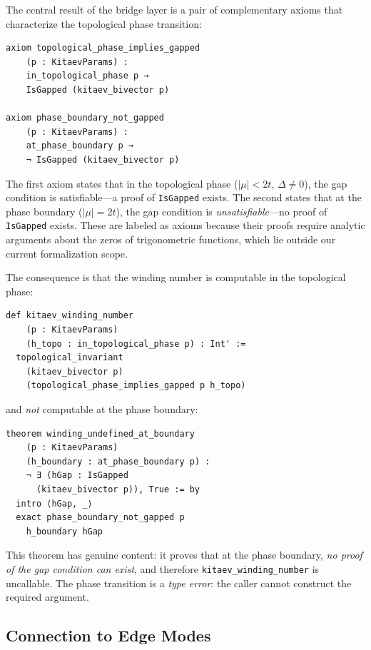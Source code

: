 \documentclass[11pt,a4paper]{article}
\newcommand{\lean}[1]{\lstinline[language=Lean4]{#1}}
\begin{document}
The central result of the bridge layer is a pair of complementary axioms that characterize the topological phase transition:

\begin{lstlisting}
axiom topological_phase_implies_gapped
    (p : KitaevParams) :
    in_topological_phase p →
    IsGapped (kitaev_bivector p)

axiom phase_boundary_not_gapped
    (p : KitaevParams) :
    at_phase_boundary p →
    ¬ IsGapped (kitaev_bivector p)
\end{lstlisting}

The first axiom states that in the topological phase ($|\mu| < 2t$, $\Delta \neq 0$), the gap condition is satisfiable---a proof of \lean{IsGapped} exists. The second states that at the phase boundary ($|\mu| = 2t$), the gap condition is \emph{unsatisfiable}---no proof of \lean{IsGapped} exists. These are labeled as axioms because their proofs require analytic arguments about the zeros of trigonometric functions, which lie outside our current formalization scope.

The consequence is that the winding number is computable in the topological phase:

\begin{lstlisting}
def kitaev_winding_number
    (p : KitaevParams)
    (h_topo : in_topological_phase p) : Int' :=
  topological_invariant
    (kitaev_bivector p)
    (topological_phase_implies_gapped p h_topo)
\end{lstlisting}

and \emph{not} computable at the phase boundary:

\begin{lstlisting}
theorem winding_undefined_at_boundary
    (p : KitaevParams)
    (h_boundary : at_phase_boundary p) :
    ¬ ∃ (hGap : IsGapped
      (kitaev_bivector p)), True := by
  intro ⟨hGap, _⟩
  exact phase_boundary_not_gapped p
    h_boundary hGap
\end{lstlisting}

This theorem has genuine content: it proves that at the phase boundary, \emph{no proof of the gap condition can exist}, and therefore \lean{kitaev_winding_number} is uncallable. The phase transition is a \emph{type error}: the caller cannot construct the required argument.

\subsection{Connection to Edge Modes}
\end{document}
